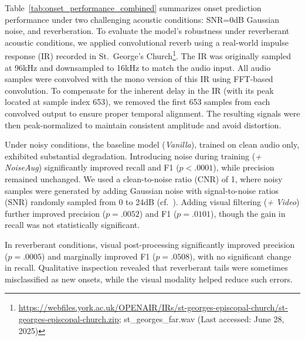 \documentclass{article}
\begin{document}
Table~\ref{tab:onset_performance_combined} summarizes onset prediction performance under two challenging acoustic conditions: SNR=0\si{dB} Gaussian noise, and reverberation. To evaluate the model's robustness under reverberant acoustic conditions, we applied convolutional reverb using a real-world impulse response (IR) recorded in St.~George's Church\footnote{\href{https://webfiles.york.ac.uk/OPENAIR/IRs/st-georges-episcopal-church/st-georges-episcopal-church.zip}{https://webfiles.york.ac.uk/OPENAIR/IRs/st-georges-episcopal-church/st-georges-episcopal-church.zip}; st\_georges\_far.wav (Last accessed: June 28, 2025)}. The IR was originally sampled at 96\si{kHz} and downsampled to 16\si{kHz} to match the audio input. All audio samples were convolved with the mono version of this IR using FFT-based convolution. To compensate for the inherent delay in the IR (with its peak located at sample index 653), we removed the first 653 samples from each convolved output to ensure proper temporal alignment. The resulting signals were then peak-normalized to maintain consistent amplitude and avoid distortion.

Under noisy conditions, the baseline model (\textit{Vanilla}), trained on clean audio only, exhibited substantial degradation. Introducing noise during training (\textit{+ NoiseAug}) significantly improved recall and F1 ($p < .0001$), while precision remained unchanged. We used a clean-to-noise ratio (CNR) of 1, where noisy samples were generated by adding Gaussian noise with signal-to-noise ratios (SNR) randomly sampled from 0 to 24\si{dB} (cf.~\cite{ISMIR24Kim}). Adding visual filtering (\textit{+ Video}) further improved precision ($p = .0052$) and F1 ($p = .0101$), though the gain in recall was not statistically significant.

In reverberant conditions, visual post-processing significantly improved precision ($p = .0005$) and marginally improved F1 ($p = .0508$), with no significant change in recall. Qualitative inspection revealed that reverberant tails were sometimes misclassified as new onsets, while the visual modality helped reduce such errors.

 
\end{document}
